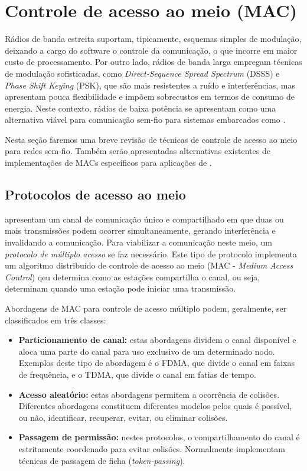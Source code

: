 \section{Controle de acesso ao meio (MAC)}
\label{sec:MAC}

Rádios de banda estreita suportam, tipicamente, esquemas simples de modulação,
deixando a cargo do software o controle da comunicação, o que incorre em maior
custo de processamento. Por outro lado, rádios de banda larga empregam técnicas
de modulação sofisticadas, como \emph{Direct-Sequence Spread Spectrum} (DSSS) e
\emph{Phase Shift Keying} (PSK), que são mais resistentes a ruído e
interferências, mas apresentam pouca flexibilidade e impõem sobrecustos em
termos de consumo de energia. Neste contexto, rádios de baixa potência se
apresentam como uma alternativa viável para comunicação sem-fio para sistemas
embarcados como \rssf.

Nesta seção faremos uma breve revisão de técnicas de controle de acesso ao meio
para redes sem-fio. Também serão apresentadas alternativas existentes de
implementações de MACs específicos para aplicações de \rssf.

\subsection{Protocolos de acesso ao meio}

\Rssf apresentam um canal de comunicação único e compartilhado em que duas ou
mais transmissões podem ocorrer simultaneamente, gerando interferência e
invalidando a comunicação. Para viabilizar a comunicação neste meio, um
\emph{protocolo de múltiplo acesso} se faz necessário. Este tipo de protocolo
implementa um algoritmo distribuído de controle de acesso ao meio (MAC -
\textit{Medium Access Control}) qeu determina como as estações compartilha o
canal, ou seja, determinam quando uma estação pode iniciar uma transmissão.

Abordagens de MAC para controle de acesso múltiplo podem, geralmente, ser
classificados em três classes:
\begin{itemize}
  \item \textbf{Particionamento de canal:} estas abordagens dividem o canal
  disponível e aloca uma parte do canal para uso exclusivo de um determinado
  nodo. Exemplos deste tipo de abordagem é o FDMA, que divide o canal em faixas
  de frequência, e o TDMA, que divide o canal em fatias de tempo.
  \item \textbf{Acesso aleatório:} estas abordagens permitem a ocorrência de
  colisões. Diferentes abordagens constituem diferentes modelos pelos quais é
  possível, ou não, identificar, recuperar, evitar, ou eliminar colisões.
  \item \textbf{Passagem de permissão:} nestes protocolos, o compartilhamento do
  canal é estritamente coordenado para evitar colisões. Normalmente implementam
  técnicas de passagem de ficha (\textit{token-passing}).
\end{itemize}

